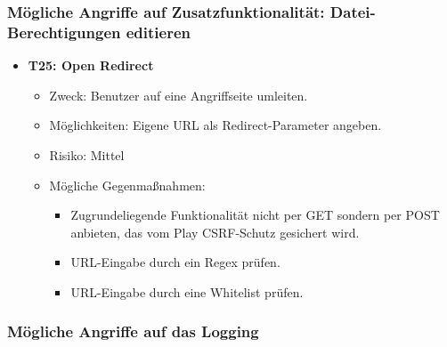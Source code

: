 \documentclass[12pt,DIV14,BCOR10mm,a4paper,parskip=half-,headsepline,headinclude,english,ngerman,bibliography=totocnumbered]{scrreprt}
\begin{document}
\subsubsection{Mögliche Angriffe auf Zusatzfunktionalität: Datei-Berechtigungen editieren}

\begin{itemize}

  \hypertarget{threat25}{}
  \item \textbf{T25: Open Redirect}
  \begin{itemize}
    \item Zweck: Benutzer auf eine Angriffseite umleiten.
    \item Möglichkeiten: Eigene URL als Redirect-Parameter angeben.
    \item Risiko: Mittel
    \item Mögliche Gegenmaßnahmen:
      \begin{itemize}
      	\item Zugrundeliegende Funktionalität nicht per GET sondern per POST anbieten, das vom Play CSRF-Schutz gesichert wird.
      	\item URL-Eingabe durch ein Regex prüfen.
      	\item URL-Eingabe durch eine Whitelist prüfen.
      \end{itemize}
  \end{itemize}
\end{itemize}

\subsubsection{Mögliche Angriffe auf das Logging}
\end{document}
